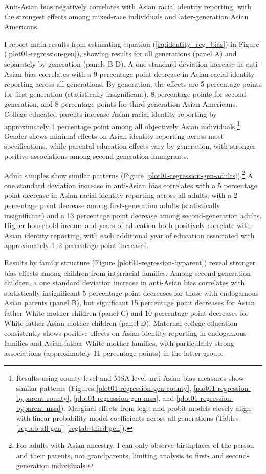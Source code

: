 Anti-Asian bias negatively correlates with Asian racial identity reporting, with the strongest effects among mixed-race individuals and later-generation Asian Americans.

I report main results from estimating equation (\ref{eq:identity_reg_bias}) in Figure (\ref{plot01-regression-gen}), showing results for all generations (panel A) and separately by generation (panels B-D). A one standard deviation increase in anti-Asian bias correlates with a 9 percentage point decrease in Asian racial identity reporting across all generations. By generation, the effects are 5 percentage points for first-generation (statistically insignificant), 8 percentage points for second-generation, and 8 percentage points for third-generation Asian Americans. College-educated parents increase Asian racial identity reporting by approximately 1 percentage point among all objectively Asian individuals.\footnote{Results using county-level and MSA-level anti-Asian bias measures show similar patterns (Figures \ref{plot01-regression-gen-county}, \ref{plot01-regression-byparent-county}, \ref{plot01-regression-gen-msa}, and \ref{plot01-regression-byparent-msa}). Marginal effects from logit and probit models closely align with linear probability model coefficients across all generations (Tables \ref{regtab-all-gen}--\ref{regtab-third-gen}).} Gender shows minimal effects on Asian identity reporting across most specifications, while parental education effects vary by generation, with stronger positive associations among second-generation immigrants.

Adult samples show similar patterns (Figure \ref{plot01-regression-gen-adults}).\footnote{For adults with Asian ancestry, I can only observe birthplaces of the person and their parents, not grandparents, limiting analysis to first- and second-generation individuals.} A one standard deviation increase in anti-Asian bias correlates with a 5 percentage point decrease in Asian racial identity reporting across all adults, with a 2 percentage point decrease among first-generation adults (statistically insignificant) and a 13 percentage point decrease among second-generation adults. Higher household income and years of education both positively correlate with Asian identity reporting, with each additional year of education associated with approximately 1--2 percentage point increases.

Results by family structure (Figure \ref{plot01-regression-byparent}) reveal stronger bias effects among children from interracial families. Among second-generation children, a one standard deviation increase in anti-Asian bias correlates with statistically insignificant 5 percentage point decreases for those with endogamous Asian parents (panel B), but significant 15 percentage point decreases for Asian father-White mother children (panel C) and 10 percentage point decreases for White father-Asian mother children (panel D). Maternal college education consistently shows positive effects on Asian identity reporting in endogamous families and Asian father-White mother families, with particularly strong associations (approximately 11 percentage points) in the latter group.

